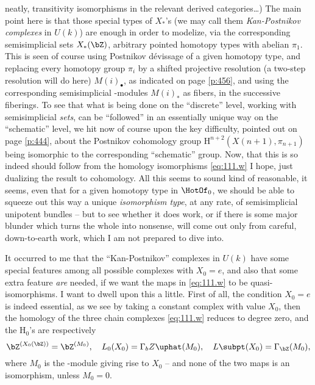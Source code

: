 neatly, transitivity isomorphisms in the relevant derived
categories\dots) The main point here is that those special types of
$X_*$'s (we may call them \emph{Kan-Postnikov complexes} in $U(k)$)
are enough in order to modelize, via the corresponding semisimplicial
sets $X_*(\bZ)$, arbitrary pointed homotopy types with abelian
$\pi_1$. This is seen of course using Postnikov dévissage
of a given homotopy type, and replacing every homotopy group $\pi_i$
by a shifted projective resolution (a two-step resolution will do
here) $M(i)_\bullet$, as indicated on page \ref{p:456}, and using the
corresponding semisimplicial \bZ-modules $M(i)_*$ as fibers, in the
successive fiberings. To see that what is being done on the
``discrete'' level, working with semisimplicial \emph{sets}, can be
``followed'' in an essentially unique way on the ``schematic'' level,
we hit now of course upon the key difficulty, pointed out on page
\ref{p:444}, about the Postnikov cohomology group $\mathrm
H^{n+2}(X(n+1),\pi_{n+1})$ being isomorphic to the corresponding
``schematic'' group. Now, that this is so indeed should follow from
the homology isomorphisms \eqref{eq:111.w} I hope, just dualizing the
result to cohomology. All this seems to sound kind of reasonable, it
seems, even that for a given homotopy type in $\HotOf_0$, we should be
able to squeeze out this way a unique \emph{isomorphism type}, at any
rate, of semisimplicial unipotent bundles -- but to see whether it
does work, or if there is some major blunder which turns the whole
into nonsense, will come out only from careful, down-to-earth work,
which I am not prepared to dive into.

It occurred to me that the ``Kan-Postnikov'' complexes in $U(k)$ have
some special features among all possible complexes with $X_0=e$, and
also that some extra feature \emph{are} needed, if we want the maps in
\eqref{eq:111.w} to be quasi-isomorphisms. I want to dwell upon this a
little. First of all, the condition $X_0=e$ is indeed essential, as we
see by taking a constant complex with value $X_0$, then the homology
of the three chain complexes \eqref{eq:111.w} reduces to degree zero,
and the $\mathrm H_0$'s are respectively
\[\bZ^{(X_0(\bZ))}=\bZ^{(M_0)}, \quad
L_0(X_0)=\Gamma_bZ\uphat(M_0), \quad
L\subpt(X_0)=\Gamma_\bZ(M_0),\]
where $M_0$ is the \bZ-module giving rise to $X_0$ -- and none of the
two maps is an isomorphism, unless $M_0=0$.

